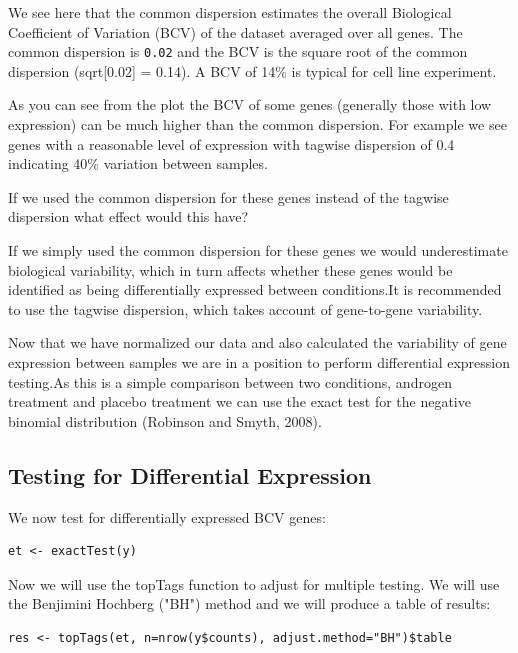 \begin{steps}
\begin{information}
We see here that the common dispersion estimates the overall Biological Coefficient of
Variation (BCV) of the dataset averaged over all genes. The common dispersion is
\texttt{0.02} and the BCV is the square root of the common dispersion (sqrt[0.02] = 0.14).
A BCV of 14\% is typical for cell line experiment.

As you can see from the plot the BCV of some genes (generally those with low expression) can be much higher than the common dispersion. For example we see genes with a reasonable level of expression with tagwise dispersion of 0.4 indicating 40\% variation between samples. 
\end{information}


\begin{questions}
If we used the common dispersion for these genes instead of the tagwise dispersion what effect would this have?	
\end{questions}


\begin{information}
If we simply used the common dispersion for these genes we would underestimate biological variability, which in turn affects whether these genes would be identified as being differentially expressed between conditions.It is recommended to use the tagwise dispersion, which takes account of gene-to-gene variability.
	
\end{information}Now that we have normalized our data and also calculated the variability of gene expression between samples we are in a position to perform differential expression testing.As this is a simple comparison between two conditions, androgen treatment and placebo treatment we can use the exact test for the negative binomial distribution (Robinson and Smyth, 2008). 

\subsection{Testing for Differential Expression}
\begin{steps}
We now test for differentially expressed BCV genes:
\begin{lstlisting}
et <- exactTest(y)
\end{lstlisting}


Now we will use the topTags function to adjust for multiple testing. We will use the
Benjimini Hochberg ("BH") method and we will produce a table of results:
\begin{lstlisting}
res <- topTags(et, n=nrow(y$counts), adjust.method="BH")$table
\end{lstlisting}


\end{steps}
\end{steps}
